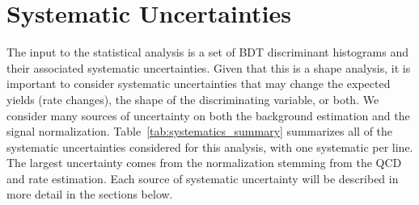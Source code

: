 \section{Systematic Uncertainties}

The input to the statistical analysis is a set of BDT discriminant histograms and their associated systematic uncertainties.
Given that this is a shape analysis, it is important to consider systematic uncertainties that may change the expected yields (rate changes), the shape of the discriminating variable, or both.
We consider many sources of uncertainty on both the background estimation and the signal normalization.
Table~\ref{tab:systematics_summary} summarizes all of the systematic uncertainties considered for this analysis, with one systematic per line.
The largest uncertainty comes from the \Wjets normalization stemming from the QCD and \Wjets rate estimation.
Each source of systematic uncertainty will be described in more detail in the sections below.


